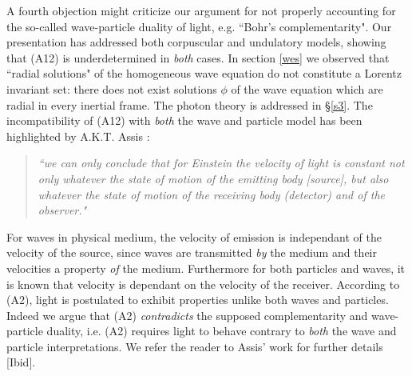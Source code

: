 \documentclass[12pt]{article}
\begin{document}
A fourth objection might criticize our argument for not properly accounting for the so-called wave-particle duality of light, e.g. ``Bohr's complementarity". Our presentation has addressed both corpuscular and undulatory models, showing that (A12) is underdetermined in \emph{both} cases. In section \ref{wes} we observed that ``radial solutions" of the homogeneous wave equation do not constitute a Lorentz invariant set: there does not exist solutions $\phi$ of the wave equation which are radial in every inertial frame. The photon theory is addressed in \S \ref{s3}. The incompatibility of (A12) with \emph{both} the wave and particle model has been highlighted by A.K.T. Assis \cite[\S 7.2.4, pp.133]{assis1999relational}:  
\begin{quote} \emph{``we can only conclude that for Einstein the velocity of light is constant not only whatever the state of motion of the emitting body [source], but also whatever the state of motion of the receiving body (detector) and of the observer."} 
\end{quote}
For waves in physical medium, the velocity of emission is independant of the velocity of the source, since waves are transmitted \emph{by} the medium and their velocities a property \emph{of} the medium. Furthermore for both particles and waves, it is known that velocity is dependant on the velocity of the receiver. According to (A2), light is postulated to exhibit properties unlike both waves and particles. Indeed we argue that (A2) \emph{contradicts} the supposed complementarity and wave-particle duality, i.e.  (A2) requires light to behave contrary to \emph{both} the wave and particle interpretations. We refer the reader to Assis' work for further details [Ibid].












\end{document}
